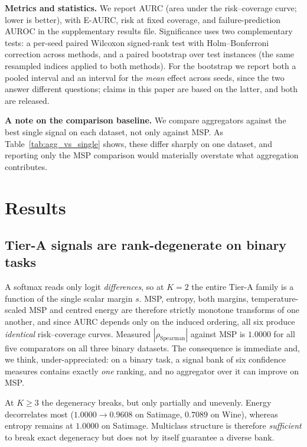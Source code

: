 \documentclass[conference]{IEEEtran}
\begin{document}
\textbf{Metrics and statistics.} We report AURC (area under the
risk--coverage curve; lower is better), with E-AURC, risk at fixed
coverage, and failure-prediction AUROC in the supplementary results file.
Significance uses two complementary tests: a per-seed paired Wilcoxon
signed-rank test with Holm--Bonferroni correction across methods, and a
paired bootstrap over test instances (the same resampled indices applied
to both methods). For the bootstrap we report both a pooled interval and
an interval for the \emph{mean} effect across seeds, since the two answer
different questions; claims in this paper are based on the latter, and
both are released.

\textbf{A note on the comparison baseline.} We compare aggregators against
the best single signal on each dataset, not only against MSP. As
Table~\ref{tab:agg_vs_single} shows, these differ sharply on one dataset,
and reporting only the MSP comparison would materially overstate what
aggregation contributes.

\section{Results}
\label{sec:results}

\subsection{Tier-A signals are rank-degenerate on binary tasks}
\label{sec:degeneracy}

A softmax reads only logit \emph{differences}, so at $K{=}2$ the entire
Tier-A family is a function of the single scalar margin $s$. MSP,
entropy, both margins, temperature-scaled MSP and centred energy are
therefore strictly monotone transforms of one another, and since AURC
depends only on the induced ordering, all six produce \emph{identical}
risk--coverage curves. Measured $|\rho_{\mathrm{Spearman}}|$ against MSP
is $1.0000$ for all five comparators on all three binary datasets. The
consequence is immediate and, we think, under-appreciated: on a binary
task, a signal bank of six confidence measures contains exactly
\emph{one} ranking, and no aggregator over it can improve on MSP.

At $K \ge 3$ the degeneracy breaks, but only partially and unevenly.
Energy decorrelates most ($1.0000 \to 0.9608$ on Satimage, $0.7089$ on
Wine), whereas entropy remains at $1.0000$ on Satimage. Multiclass
structure is therefore \emph{sufficient} to break exact degeneracy but
does not by itself guarantee a diverse bank.
\end{document}
